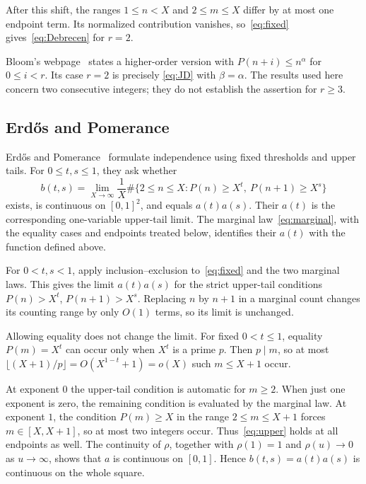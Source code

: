 \documentclass[11pt,a4paper]{amsart}
\begin{document}
After this shift, the ranges $1\le n<X$ and $2\le m\le X$ differ
by at most one endpoint term. Its normalized contribution vanishes,
so~\eqref{eq:fixed} gives~\eqref{eq:Debrecen} for $r=2$.

Bloom's webpage~\cite{Bloom928} states a higher-order version with
$P(n+i)\le n^\alpha$ for $0\le i<r$. Its case $r=2$ is precisely
\eqref{eq:JD} with $\beta=\alpha$. The results used here concern two
consecutive integers; they do not establish the assertion for $r\ge3$.

\subsection{Erd\H{o}s and Pomerance}
Erd\H{o}s and Pomerance~\cite[p.~311]{ErdosPomerance1978} formulate
independence using fixed thresholds and upper tails. For $0\le t,s\le1$,
they ask whether
\begin{equation}\label{eq:upper}
 b(t,s)=\lim_{X\to\infty}\frac1X
 \#\{2\le n\le X:P(n)\ge X^t,\ P(n+1)\ge X^s\}
\end{equation}
exists, is continuous on $[0,1]^2$, and equals $a(t)a(s)$.
Their $a(t)$ is the corresponding one-variable upper-tail limit.
The marginal law~\eqref{eq:marginal}, with the equality cases and
endpoints treated below, identifies their $a(t)$ with the function
defined above.

For $0<t,s<1$, apply inclusion--exclusion to~\eqref{eq:fixed} and the
two marginal laws. This gives the limit $a(t)a(s)$ for the strict
upper-tail conditions $P(n)>X^t$, $P(n+1)>X^s$.
Replacing $n$ by $n+1$ in a marginal count changes its counting range
by only $O(1)$ terms, so its limit is unchanged.

Allowing equality does not change the limit. For fixed $0<t\le1$,
equality $P(m)=X^t$ can occur only when $X^t$ is a prime $p$.
Then $p\mid m$, so at most
$\lfloor(X+1)/p\rfloor=O(X^{1-t}+1)=o(X)$ such $m\le X+1$ occur.

At exponent $0$ the upper-tail condition is automatic for $m\ge2$.
When just one exponent is zero, the remaining condition is evaluated
by the marginal law. At exponent $1$, the condition $P(m)\ge X$ in
the range $2\le m\le X+1$ forces $m\in[X,X+1]$, so at most two
integers occur. Thus~\eqref{eq:upper} holds at all endpoints as well.
The continuity of $\rho$, together with $\rho(1)=1$ and
$\rho(u)\to0$ as $u\to\infty$, shows that $a$ is continuous on $[0,1]$.
Hence $b(t,s)=a(t)a(s)$ is continuous on the whole square.
\end{document}
